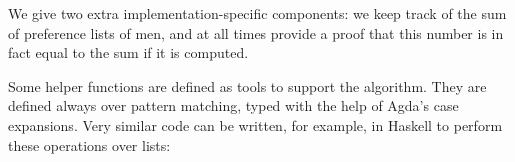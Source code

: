 {We give two extra implementation-specific components: we keep track of the sum of preference lists of men, and at all times provide a proof that this number is in fact equal to the sum if it is computed.

Some helper functions are defined as tools to support the algorithm. They are defined always over pattern matching, typed with the help of Agda's case expansions. Very similar code can be written, for example, in Haskell to perform these operations over lists:

\begin{code}%
\>[0]\<%
\\
\>[0]\AgdaSpace{}%
\AgdaSymbol{:}\AgdaSpace{}%
\AgdaSpace{}%
\AgdaSpace{}%
\AgdaSpace{}%
\AgdaSpace{}%
\<%
\\
\>[0]\AgdaSpace{}%
\AgdaSpace{}%
\AgdaSpace{}%
\AgdaSpace{}%
\AgdaSpace{}%
\AgdaSpace{}%
\<%
\\
\>[0]\AgdaSpace{}%
\AgdaSymbol{|}\AgdaSpace{}%
\AgdaSpace{}%
\AgdaSymbol{\AgdaUnderscore{}}\AgdaSpace{}%
\AgdaSymbol{=}\AgdaSpace{}%
\<%
\\
\>[0]\AgdaSpace{}%
\AgdaSymbol{|}\AgdaSpace{}%
\AgdaSpace{}%
\AgdaSymbol{\AgdaUnderscore{}}\AgdaSpace{}%
\AgdaSymbol{=}\AgdaSpace{}%
\<%
\\
%
\\[\AgdaEmptyExtraSkip]%
\>[0]\<%
\\
\>[0]\AgdaSpace{}%
\AgdaSymbol{:}\AgdaSpace{}%
\AgdaSpace{}%
\AgdaSpace{}%
\AgdaSpace{}%
\AgdaSpace{}%
\AgdaSpace{}%
\AgdaSpace{}%
\AgdaSpace{}%
\AgdaSpace{}%
\<%
\\
\>[0]\<%
\\
\>[0]\AgdaSpace{}%
\AgdaSpace{}%
\AgdaInductiveConstructor{[]}\AgdaSpace{}%
\AgdaSymbol{\AgdaUnderscore{}}\AgdaSpace{}%

\end{code}}
